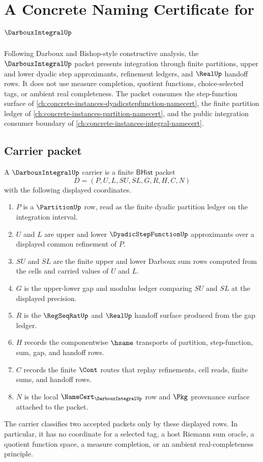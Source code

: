 \chapter{A Concrete Naming Certificate for $\DarbouxIntegralUp$}
\label{ch:concrete-instances-darbouxintegral-namecert}

Following Darboux and Bishop-style constructive analysis, the $\DarbouxIntegralUp$ packet presents integration through finite partitions, upper and lower dyadic step approximants, refinement ledgers, and $\RealUp$ handoff rows. It does not use measure completion, quotient functions, choice-selected tags, or ambient real completeness. The packet consumes the step-function surface of \autoref{ch:concrete-instances-dyadicstepfunction-namecert}, the finite partition ledger of \autoref{ch:concrete-instances-partition-namecert}, and the public integration consumer boundary of \autoref{ch:concrete-instances-integral-namecert}.

\section{Carrier packet}
\label{sec:darboux-integral-carrier}

\begin{definition}
\label{def:darboux-integral-carrier}
A $\DarbouxIntegralUp$ carrier is a finite $\mathsf{BHist}$ packet
$$
D=(P,U,L,SU,SL,G,R,H,C,N)
$$
with the following displayed coordinates.
\begin{enumerate}
  \item $P$ is a $\PartitionUp$ row, read as the finite dyadic partition ledger on the integration interval.
  \item $U$ and $L$ are upper and lower $\DyadicStepFunctionUp$ approximants over a displayed common refinement of $P$.
  \item $SU$ and $SL$ are the finite upper and lower Darboux sum rows computed from the cells and carried values of $U$ and $L$.
  \item $G$ is the upper-lower gap and modulus ledger comparing $SU$ and $SL$ at the displayed precision.
  \item $R$ is the $\RegSeqRatUp$ and $\RealUp$ handoff surface produced from the gap ledger.
  \item $H$ records the componentwise $\hsame$ transports of partition, step-function, sum, gap, and handoff rows.
  \item $C$ records the finite $\Cont$ routes that replay refinements, cell reads, finite sums, and handoff rows.
  \item $N$ is the local $\NameCert_{\DarbouxIntegralUp}$ row and $\Pkg$ provenance surface attached to the packet.
\end{enumerate}
The carrier classifies two accepted packets only by these displayed rows. In particular, it has no coordinate for a selected tag, a host Riemann sum oracle, a quotient function space, a measure completion, or an ambient real-completeness principle.
\end{definition}

